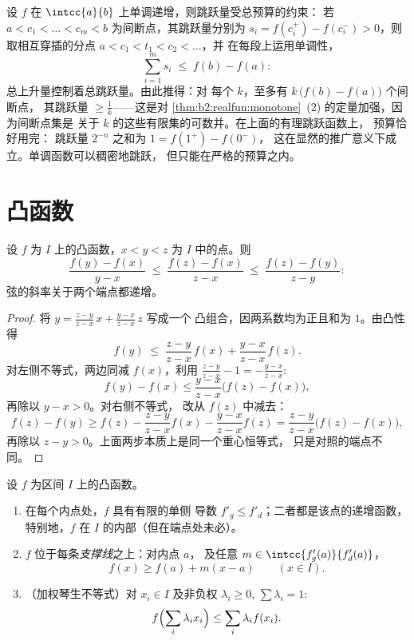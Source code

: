 \begin{example}[跳跃量不超过上升量]\label{ex:b2:realfun:jumpbudget}
设 $f$ 在 $\intcc{a}{b}$ 上单调递增，则跳跃量受总预算的约束：
若 $a < c_1 < \dots < c_m < b$ 为间断点，其跳跃量分别为
$s_i = f(c_i^+) - f(c_i^-) > 0$，则取相互穿插的分点
$a < c_1 < t_1 < c_2 < \dots$，并
在每段上运用单调性，
\[
\sum_{i=1}^{m} s_i \;\leq\; f(b) - f(a) :
\]
总上升量控制着总跳跃量。由此推得：对
每个 $k$，至多有 $k\,\bigl(f(b) - f(a)\bigr)$ 个间断点，
其跳跃量 $\geq \frac1k$——这是对
\cref{thm:b2:realfun:monotone}~(2) 的定量加强，因为间断点集是
关于 $k$ 的这些有限集的可数并。在上面的有理跳跃函数上，
预算恰好用完：
跳跃量 $2^{-n}$ 之和为 $1 = f(1^+) - f(0^-)$，
这在显然的推广意义下成立。单调函数可以稠密地跳跃，
但只能在严格的预算之内。
\end{example}

\section{凸函数}

\begin{lemma}[斜率不等式]\label{lem:b2:realfun:slopes}
设 $f$ 为 $I$ 上的凸函数，$x < y < z$ 为 $I$ 中的点。则
\[
\frac{f(y) - f(x)}{y - x}
\;\leq\; \frac{f(z) - f(x)}{z - x}
\;\leq\; \frac{f(z) - f(y)}{z - y} :
\]
弦的斜率关于两个端点都递增。
\end{lemma}

\begin{proof}
将 $y = \frac{z - y}{z - x}\,x + \frac{y - x}{z - x}\,z$ 写成一个
凸组合，因两系数均为正且和为
$1$。由凸性得
\[
f(y) \;\leq\; \frac{z-y}{z-x}\,f(x) + \frac{y-x}{z-x}\,f(z).
\]
对左侧不等式，两边同减 $f(x)$，利用
$\frac{z-y}{z-x} - 1 = -\frac{y-x}{z-x}$:
\[
f(y) - f(x) \leq \frac{y - x}{z - x}\bigl(f(z) - f(x)\bigr),
\]
再除以 $y - x > 0$。对右侧不等式，
改从 $f(z)$ 中减去：
\[
f(z) - f(y) \geq f(z) - \frac{z-y}{z-x}f(x) -
\frac{y-x}{z-x}f(z)
= \frac{z - y}{z - x}\bigl(f(z) - f(x)\bigr),
\]
再除以 $z - y > 0$。上面两步本质上是同一个重心恒等式，
只是对照的端点不同。
\end{proof}

\begin{theorem}[凸函数的正则性]\label{thm:b2:realfun:convexreg}
设 $f$ 为区间 $I$ 上的凸函数。
\begin{enumerate}
  \item 在每个内点处，$f$ 具有有限的单侧
        导数 $f'_g \leq f'_d$；二者都是该点的递增函数，
        特别地，$f$ 在
        $I$ 的内部（但在端点处未必）。
  \item $f$ 位于每条\emph{支撑线}之上：对内点 $a$，
        及任意 $m \in \intcc{f'_g(a)}{f'_d(a)}$，
        \[
        f(x) \geq f(a) + m(x - a) \qquad (x \in I).
        \]
  \item （加权琴生不等式）对 $x_i \in I$ 及非负权 $\lambda_i
        \geq 0$, $\sum\lambda_i = 1$:
        \[
        f\Bigl(\sum_i \lambda_i x_i\Bigr) \leq \sum_i \lambda_i
        f(x_i) .\index{詹森不等式}
        \]
\end{enumerate}
\end{theorem}

